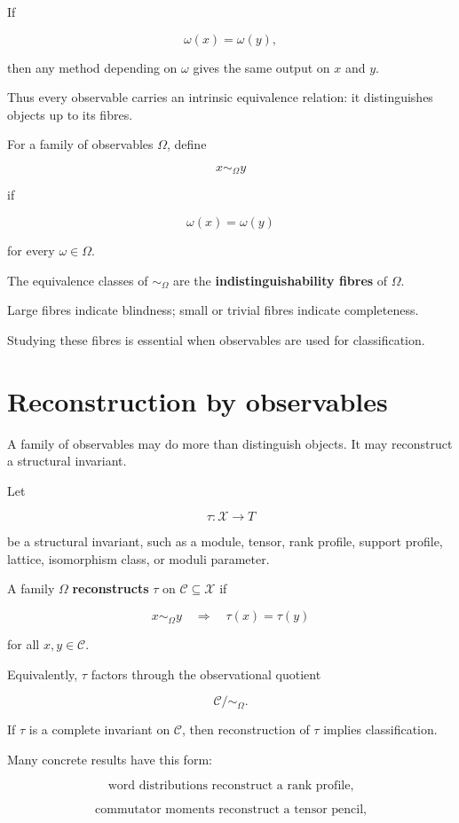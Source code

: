 \documentclass[11pt]{article}
\begin{document}
If

\[
\omega(x)=\omega(y),
\]

then any method depending on \(\omega\) gives the same output on \(x\) and \(y\).

Thus every observable carries an intrinsic equivalence relation: it distinguishes objects up to its fibres.

For a family of observables \(\Omega\), define

\[
x\sim_\Omega y
\]

if

\[
\omega(x)=\omega(y)
\]

for every \(\omega\in\Omega\).

The equivalence classes of \(\sim_\Omega\) are the \textbf{indistinguishability fibres} of \(\Omega\).

Large fibres indicate blindness; small or trivial fibres indicate completeness.

Studying these fibres is essential when observables are used for classification.


\section{Reconstruction by observables}

A family of observables may do more than distinguish objects. It may reconstruct a structural invariant.

Let

\[
\tau:\mathcal X\to T
\]

be a structural invariant, such as a module, tensor, rank profile, support profile, lattice, isomorphism class, or moduli parameter.

A family \(\Omega\) \textbf{reconstructs} \(\tau\) on \(\mathcal C\subseteq\mathcal X\) if

\[
x\sim_\Omega y
\quad\Longrightarrow\quad
\tau(x)=\tau(y)
\]

for all \(x,y\in\mathcal C\).

Equivalently, \(\tau\) factors through the observational quotient

\[
\mathcal C/\!\sim_\Omega.
\]

If \(\tau\) is a complete invariant on \(\mathcal C\), then reconstruction of \(\tau\) implies classification.

Many concrete results have this form:

\[
\text{word distributions reconstruct a rank profile,}
\]

\[
\text{commutator moments reconstruct a tensor pencil,}
\]
\end{document}
